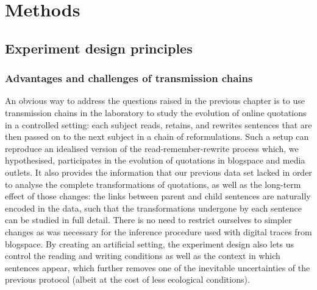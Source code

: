 \documentclass[a4paper,fleqn]{cas-dc}
\begin{document}


\section{Methods}\label{sec:gistr-methods}

\subsection{Experiment design
principles}\label{experiment-design-principles}

\subsubsection{Advantages and challenges of transmission
chains}\label{advantages-and-challenges-of-transmission-chains}

An obvious way to address the questions raised in the previous chapter
is to use transmission chains in the laboratory to study the evolution
of online quotations in a controlled setting: each subject reads,
retains, and rewrites sentences that are then passed on to the next
subject in a chain of reformulations. Such a setup can reproduce an
idealised version of the read-remember-rewrite process which, we
hypothesised, participates in the evolution of quotations in blogspace
and media outlets. It also provides the information that our previous
data set lacked in order to analyse the complete transformations of
quotations, as well as the long-term effect of those changes: the links
between parent and child sentences are naturally encoded in the data,
such that the transformations undergone by each sentence can be studied
in full detail. There is no need to restrict ourselves to simpler
changes as was necessary for the inference procedure used with digital
traces from blogspace. By creating an artificial setting, the experiment
design also lets us control the reading and writing conditions as well
as the context in which sentences appear, which further removes one of
the inevitable uncertainties of the previous protocol (albeit at the
cost of less ecological conditions).
\end{document}
